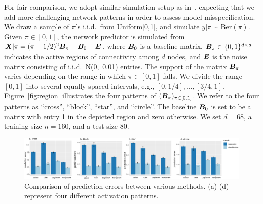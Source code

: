 \documentclass[11pt]{article}
\theoremstyle{definition}
\begin{document}
For fair comparison, we adopt similar simulation setup as in~\cite{relion2019network}, expecting that we add more challenging network patterns in order to assess model misspecification. We draw a sample of $\pi$'s i.i.d.\ from Uniform[0,1], and simulate $y|\pi\sim \text{Ber}(\pi)$. Given $\pi\in[0,1]$, the network predictor is simulated from $\bm X|\pi = (\pi-1/2)^2\bm B_\pi+\bm B_0 + \bm{E}$, where $\bm B_0$ is a baseline matrix, $\bm B_\pi\in\{0,1\}^{d\times d}$ indicates the active regions of connectivity among $d$ nodes, and $\bm{E}$ is the noise matrix consisting of i.i.d.\ N(0,\ 0.01) entries. The support of the matrix $\bm B_\pi$ varies depending on the range in which $\pi\in[0,1]$ falls. We divide the range $[0,1]$ into several equally spaced intervals, e.g., $[0,1/4],\ldots,[3/4,1]$. Figure~\ref{fig:region} illustrates the four patterns of $(\bm B_\pi)_{\pi\in[0,1]}$. We refer to the four patterns as ``cross'', ``block'', ``star'', and ``circle''. The baseline $\bm B_0$ is set to be a matrix with entry 1 in the depicted region and zero otherwise. We set $d=68$, a training  size $n=160$, and a test size $80$. 






\begin{figure}[ht]
    \centering
    \includegraphics[width=\textwidth]{error_tot_comb2.pdf}
    \caption{Comparison of prediction errors between various methods. (a)-(d) represent four different activation patterns. }\label{fig:compare}
\end{figure}
\end{document}
